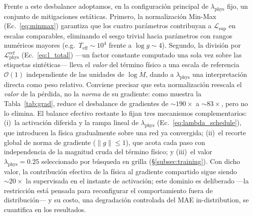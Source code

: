 \documentclass[sigconf,ACM]{acmart}
\begin{document}
Frente a este desbalance adoptamos, en la configuración principal de $\lambda_\mathrm{phys}$ fijo, un conjunto de mitigaciones estáticas. Primero, la normalización Min-Max (Ec.~\ref{eq:minmax}) garantiza que los cuatro parámetros contribuyan a $\mathcal{L}_\mathrm{sup}$ en escalas comparables, eliminando el sesgo trivial hacia parámetros con rangos numéricos mayores (e.g.\ $T_\mathrm{eff}\sim 10^4$ frente a $\log g\sim 4$). Segundo, la división por $\mathcal{L}_\mathrm{phys}^\mathrm{ref}$ (Ec.~\ref{eq:l_total}) ---un factor constante computado una sola vez sobre las etiquetas sintéticas--- lleva el \emph{valor} del término físico a una escala de referencia $\mathcal{O}(1)$ independiente de las unidades de $\log\dot{M}$, dando a $\lambda_\mathrm{phys}$ una interpretación directa como peso relativo. Conviene precisar que esta normalización reescala el \emph{valor} de la pérdida, no la \emph{norma} de su gradiente: como muestra la Tabla~\ref{tab:grad}, reduce el desbalance de gradientes de ${\sim}190\times$ a ${\sim}83\times$, pero no lo elimina. El balance efectivo restante lo fijan tres mecanismos complementarios: (i)~la activación diferida y la rampa lineal de $\lambda_\mathrm{phys}$ (Ec.~\ref{eq:lambda_schedule}), que introducen la física gradualmente sobre una red ya convergida; (ii)~el recorte global de norma de gradiente ($\lVert g\rVert\le 1$), que acota cada paso con independencia de la magnitud cruda del término físico; y (iii)~el valor $\lambda_\mathrm{phys}=0.25$ seleccionado por búsqueda en grilla (§\ref{subsec:training}). Con dicho valor, la contribución efectiva de la física al gradiente compartido sigue siendo ${\sim}20\times$ la supervisada en el instante de activación; este dominio es deliberado ---la restricción está pensada para reconfigurar el comportamiento fuera de distribución--- y su costo, una degradación controlada del MAE in-distribution, se cuantifica en los resultados.
\end{document}
